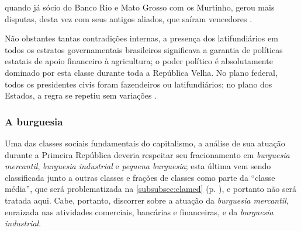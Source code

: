quando já sócio do Banco Rio e Mato Grosso com os Murtinho, gerou mais disputas, desta vez com seus antigos aliados, que saíram vencedores \cite{almeida_matogrosso_2011}. 

Não obstantes tantas contradições internas, a presença dos latifundiários em todos os estratos governamentais brasileiros significava a garantia de políticas estatais de apoio financeiro à agricultura; o poder político é absolutamente dominado por esta classe durante toda a República Velha. No plano federal, todos os presidentes civis foram fazendeiros ou latifundiários; no plano dos Estados, a regra se repetiu sem variações \cite[p.~155]{CARONE1970inst}.

\subsubsection{A burguesia}\label{subsubsec:claburg}

Uma das classes sociais fundamentais do capitalismo, a análise de sua atuação durante a Primeira República deveria respeitar seu fracionamento em \textit{burguesia mercantil}, \textit{burguesia industrial} e \textit{pequena burguesia}; esta última vem sendo classificada junto a outras classes e frações de classes como parte da ``classe média'', que será problematizada na \autoref{subsubsec:clamed} (p. \pageref{subsubsec:clamed}), e portanto não será tratada aqui. Cabe, portanto, discorrer sobre a atuação da \textit{burguesia mercantil}, enraizada nas atividades comerciais, bancárias e financeiras, e da \textit{burguesia industrial}.

